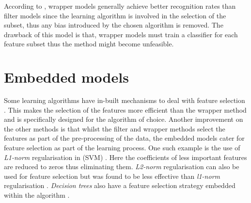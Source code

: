 According to \citet{sammut2017encyclopedia}, wrapper models generally achieve better recognition rates than filter models since the learning algorithm is involved in the selection of the subset, thus any bias introduced by the chosen algorithm is removed. The drawback of this model is that, wrapper models must train a classifier for each feature subset thus the method might become unfeasible.

\section{Embedded models}\label{sec:fs_embedded}
Some learning algorithms have in-built mechanisms to deal with feature selection \citep{guyon2003introduction,sammut2017encyclopedia}. This makes the selection of the features more efficient than the wrapper method and is specifically designed for the algorithm of choice. Another improvement on the other methods is that whilst the filter and wrapper methods select the features as part of the pre-processing of the data, the embedded models cater for feature selection as part of the learning process. One such example is the use of \textit{L1-norm} regularisation in (SVM) \citep{guyon2003introduction,de2015grammar}. Here the coefficients of less important features are reduced to zeros thus eliminating them. \textit{L2-norm} regularisation can also be used for feature selection but was found to be less effective than \textit{l1-norm} regularisation \citep{de2015grammar}. \textit{Decision trees} also have a feature selection strategy embedded within the algorithm \citep{garcia2015data}.

